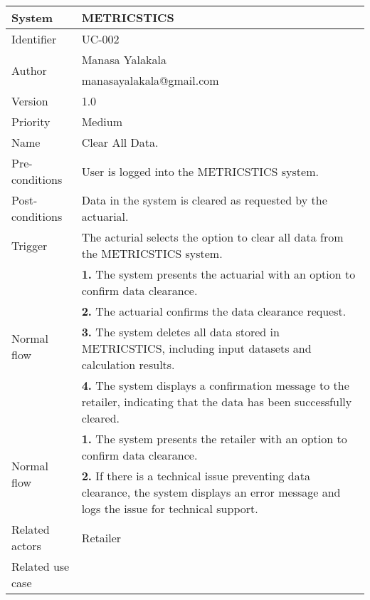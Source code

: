 \begin{table}[htb]
    \centering
    \begin{tabular}{|p{4cm}|p{12cm}|} \hline 
         System &  METRICSTICS\\ \hline 
         
         Identifier & UC-002 \\ \hline 
         
         \multirow{2}{*}{Author} & Manasa Yalakala  \\
         &manasayalakala@gmail.com \\
           \hline 
         Version & 1.0\\ \hline
         Priority &  Medium\\ \hline 
         
         Name & Clear  All Data. \\ \hline 
         Pre-conditions & User is logged into the METRICSTICS system. \\ \hline 
         Post-conditions & Data in the system is cleared as requested by the actuarial. \\ \hline
         Trigger & The acturial selects the option to clear all data from the METRICSTICS system. \\ \hline
        \multirow{4}{*}{Normal flow} 
        & \textbf{1.}  The system presents the actuarial with an option to confirm data clearance. \\ 
        & \textbf{2.} The actuarial confirms the data clearance request. \\ 
        & \textbf{3.} The system deletes all data stored in METRICSTICS, including input datasets and calculation results. \\ 
        & \textbf{4.} The system displays a confirmation message to the retailer, indicating that the data has been successfully cleared. \\ 
         
        
        \hline
        \multirow{2}{*}{Normal flow} 
        & \textbf{1.}  The system presents the retailer with an option to confirm data clearance. \\ 
        & \textbf{2.}  If there is a technical issue preventing data clearance, the system displays an error message and logs the issue for technical support. \\  \hline 
        Related actors & Retailer \\ \hline
        Related use case &  \\ \hline
    \end{tabular}
    \caption{}
    \label{tab:my_label}
\end{table}


